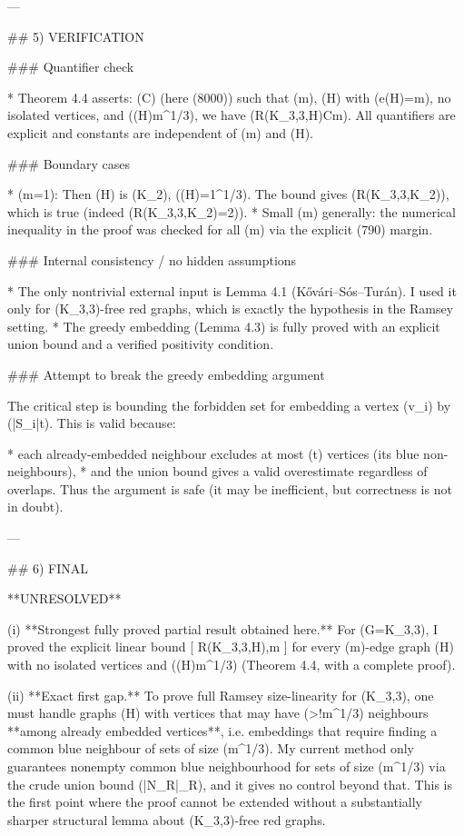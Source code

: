 ---

## 5) VERIFICATION

### Quantifier check

* Theorem 4.4 asserts: (\exists C) (here (8000)) such that (\forall m), (\forall H) with (e(H)=m), no isolated vertices, and (\Delta(H)\le m^{1/3}), we have (R(K_{3,3},H)\le Cm).
  All quantifiers are explicit and constants are independent of (m) and (H).

### Boundary cases

* (m=1): Then (H) is (K_2), (\Delta(H)=1^{1/3}). The bound gives (R(K_{3,3},K_2)), which is true (indeed (R(K_{3,3},K_2)=2)).
* Small (m) generally: the numerical inequality in the proof was checked for all (m) via the explicit (790) margin.

### Internal consistency / no hidden assumptions

* The only nontrivial external input is Lemma 4.1 (Kővári–Sós–Turán). I used it only for (K_{3,3})-free red graphs, which is exactly the hypothesis in the Ramsey setting.
* The greedy embedding (Lemma 4.3) is fully proved with an explicit union bound and a verified positivity condition.

### Attempt to break the greedy embedding argument

The critical step is bounding the forbidden set for embedding a vertex (v_i) by (|S_i|t). This is valid because:

* each already-embedded neighbour excludes at most (t) vertices (its blue non-neighbours),
* and the union bound gives a valid overestimate regardless of overlaps.
  Thus the argument is safe (it may be inefficient, but correctness is not in doubt).

---

## 6) FINAL

**UNRESOLVED**

(i) **Strongest fully proved partial result obtained here.**
For (G=K_{3,3}), I proved the explicit linear bound
[
R(K_{3,3},H),m
]
for every (m)-edge graph (H) with no isolated vertices and (\Delta(H)\le m^{1/3}) (Theorem 4.4, with a complete proof).

(ii) **Exact first gap.**
To prove full Ramsey size-linearity for (K_{3,3}), one must handle graphs (H) with vertices that may have (>!m^{1/3}) neighbours **among already embedded vertices**, i.e. embeddings that require finding a common blue neighbour of sets of size (\gg m^{1/3}).
My current method only guarantees nonempty common blue neighbourhood for sets of size (\le m^{1/3}) via the crude union bound (|\bigcup N_R|\le \sum \deg_R), and it gives no control beyond that. This is the first point where the proof cannot be extended without a substantially sharper structural lemma about (K_{3,3})-free red graphs.

